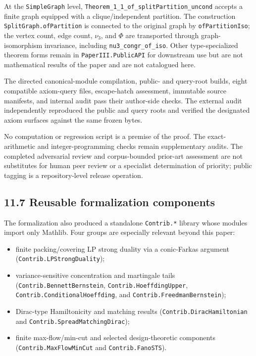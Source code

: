 \documentclass[
  american,
  11pt,
  a4paper,
]{article}
\providecommand{\tightlist}{%
  \setlength{\itemsep}{0pt}\setlength{\parskip}{0pt}}
\begin{document}
At the \texttt{SimpleGraph} level, \texttt{Theorem\_1\_1\_of\_splitPartition\_uncond} accepts a finite graph equipped with a clique/independent partition. The construction \texttt{SplitGraph.ofPartition} is connected to the original graph by \texttt{ofPartitionIso}; the vertex count, edge count, \(\nu_3\), and \(\Phi\) are transported through graph-isomorphism invariance, including \texttt{nu3\_congr\_of\_iso}. Other type-specialized theorem forms remain in \texttt{PaperIII.PublicAPI} for downstream use but are not mathematical results of the paper and are not catalogued here.

The directed canonical-module compilation, public- and query-root builds, eight compatible axiom-query files, escape-hatch assessment, immutable source manifests, and internal audit pass their author-side checks. The external audit independently reproduced the public and query roots and verified the designated axiom surfaces against the same frozen bytes.

No computation or regression script is a premise of the proof. The exact-arithmetic and integer-programming checks remain supplementary audits. The completed adversarial review and corpus-bounded prior-art assessment are not substitutes for human peer review or a specialist determination of priority; public tagging is a repository-level release operation.

\subsection{11.7 Reusable formalization components}\label{reusable-formalization-components}

The formalization also produced a standalone \texttt{Contrib.*} library whose modules import only Mathlib. Four groups are especially relevant beyond this paper:

\begin{itemize}
\tightlist
\item
  finite packing/covering LP strong duality via a conic-Farkas argument (\texttt{Contrib.LPStrongDuality});
\item
  variance-sensitive concentration and martingale tails (\texttt{Contrib.BennettBernstein}, \texttt{Contrib.HoeffdingUpper}, \texttt{Contrib.ConditionalHoeffding}, and \texttt{Contrib.FreedmanBernstein});
\item
  Dirac-type Hamiltonicity and matching results (\texttt{Contrib.DiracHamiltonian} and \texttt{Contrib.SpreadMatchingDirac});
\item
  finite max-flow/min-cut and selected design-theoretic components (\texttt{Contrib.MaxFlowMinCut} and \texttt{Contrib.FanoSTS}).
\end{itemize}
\end{document}
